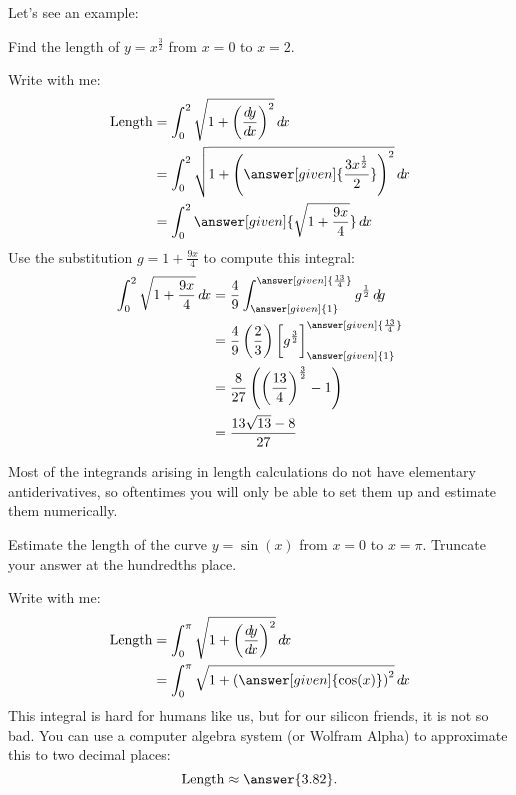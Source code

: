\documentclass{ximera}
\begin{document}
Let's see an example:
\begin{example}%
  Find the length of $y = x^{\frac{3}{2}}$ from $x=0$ to $x=2$.
  \begin{explanation}
    Write with me:
    \begin{align*}
      \text{Length} &= \int_0^2 \sqrt{1+\left( \frac{\d y}{ \d x}\right)^2} \d x\\
      &= \int_0^2 \sqrt{1+\left(
        \answer[given]{\frac{3 x^{\frac{1}{2}}}{2}}\right)^2} \d x\\
      &= \int_0^2 \answer[given]{\sqrt{1+\frac{9x}{4}}} \d x
    \end{align*}
      Use the substitution $g = 1+\frac{9x}{4}$ to compute this integral:
      \begin{align*}
	\int_0^2 \sqrt{1+\frac{9x}{4}} \d x &= \frac{4}{9} \int_{\answer[given]{1}}^{\answer[given]{\frac{13}{4}}} g^\frac{1}{2} \d g\\
	&= \frac{4}{9} \left(\frac{2}{3}\right) \eval{g^{\frac{3}{2}}}_{\answer[given]{1}}^{\answer[given]{\frac{13}{4}}}\\
	&=\frac{8}{27} \left(\left(\frac{13}{4}\right)^\frac{3}{2} - 1\right)\\
	&=\frac{13\sqrt{13} - 8}{27}
      \end{align*}
  \end{explanation}
\end{example}

Most of the integrands arising in length calculations do not have
elementary antiderivatives, so oftentimes you will only be able to set
them up and estimate them numerically.

\begin{example}
  Estimate the length of the curve $y = \sin(x)$ from $x=0$ to $x =
  \pi$.  Truncate your answer at the hundredths place.
  \begin{explanation}
    Write with me:
    \begin{align*}
      \text{Length} &= \int_0^\pi \sqrt{1+\left( \frac{\d y}{ \d x}\right)^2} \d x\\
      &= \int_0^\pi \sqrt{1+\left(
        \answer[given]{\cos(x)}\right)^2} \d x
    \end{align*}
    This integral is hard for humans like us, but for our silicon
    friends, it is not so bad.  You can use a computer algebra system
    (or Wolfram Alpha) to approximate this to two decimal places:
    \[
    \text{Length} \approx \answer{3.82}.
    \]
  \end{explanation}
\end{example}
\end{document}
